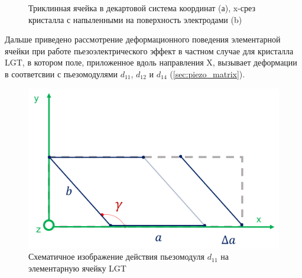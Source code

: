 \begin{figure}[H]
  \centering
  \hfill
  \caption{Триклинная ячейка в декартовой система координат (а), x-срез
  кристалла с напыленными на поверхность электродами (b)}
  \label{ris:piezo_deformation_general}
\label{ris:}
\end{figure}


Дальше приведено рассмотрение деформационного поведения элементарной ячейки при работе пьезоэлектрического
эффект в частном случае для кристалла LGT, в котором поле, приложенное вдоль направления X,
вызывает деформации в соответсвии с пьезомодулями $d_{11}$, $d_{12}$ и $d_{14}$ (\ref{sec:piezo_matrix}).

\begin{figure}[H]
  \centering
  \includegraphics[width=.5\textwidth]{images/d11.png}
  \caption{Схематичное изображение действия пьезомодуля $d_{11}$ на элементарную ячейку LGT}
  \label{ris:d11}
\end{figure}

